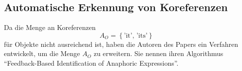 \subsection{Automatische Erkennung von Koreferenzen}
Da die Menge an Koreferenzen 
\[A_O=\left\{\text{'it', 'its'}\right\}\]
für Objekte nicht ausreichend ist, haben die Autoren des Papers \NaNg\cite{paper:Na} ein Verfahren entwickelt, um die Menge $A_O$ zu erweitern. Sie nennen ihren Algorithmus ``Feedback-Based Identification of Anaphoric Expressions''.
